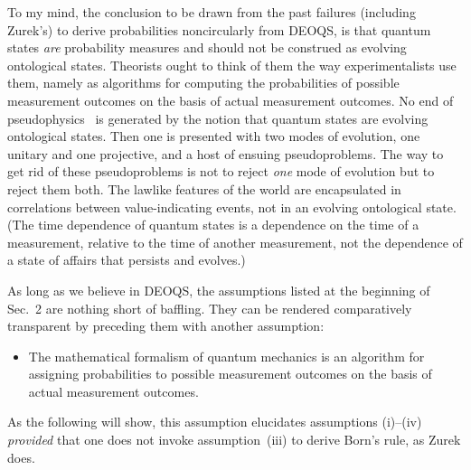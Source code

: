 \documentclass[12pt]{article}
\begin{document}
To my mind, the conclusion to be drawn from the past failures (including Zurek's) 
to derive probabilities noncircularly from DEOQS, is that quantum states {\it 
are\/} probability measures and should not be construed as evolving ontological 
states. Theorists ought to think of them the way experimentalists use them, 
namely as algorithms for computing the probabilities of possible measurement 
outcomes on the basis of actual measurement outcomes. No end of 
pseudophysics~\cite{Pseudo} is generated by the notion that quantum states 
are evolving ontological states. Then one is presented with two modes of 
evolution, one unitary and one projective, and a host of ensuing pseudoproblems. 
The way to get rid of these pseudoproblems is not to reject {\it one\/} mode of 
evolution but to reject them both. The lawlike features of the world are 
encapsulated in correlations between value-indicating events, not in an evolving 
ontological state. (The time dependence of quantum states is a dependence on 
the time of a measurement, relative to the time of another measurement, not the 
dependence of a state of affairs that persists and evolves.)

As long as we believe in DEOQS, the assumptions listed at the beginning of 
Sec.~2 are nothing short of baffling. They can be rendered comparatively 
transparent by preceding them with another assumption:
\begin{itemize}
\item The mathematical formalism of quantum mechanics is an algorithm for 
assigning probabilities to possible measurement outcomes on the basis of actual 
measurement outcomes.
\end{itemize}
As the following will show, this assumption elucidates assumptions (i)--(iv) {\it 
provided\/} that one does not invoke assumption~(iii) to derive Born's rule, as 
Zurek does.
\end{document}
